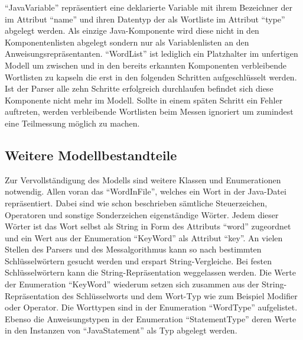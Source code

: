 \documentclass[gb,ngerman]{stthesis}
\begin{document}
				"`JavaVariable"' repräsentiert eine deklarierte Variable mit ihrem Bezeichner der im Attribut "`name"' und ihren Datentyp der als Wortliste im Attribut "`type"' abgelegt werden. Als einzige Java-Komponente wird diese nicht in den Komponentenlisten abgelegt sondern nur als Variablenlisten an den Anweisungsrepräsentanten. \newline \newline
				"`WordList"' ist lediglich ein Platzhalter im unfertigen Modell um zwischen und in den bereits erkannten Komponenten verbleibende Wortlisten zu kapseln die erst in den folgenden Schritten aufgeschlüsselt werden. Ist der Parser alle zehn Schritte erfolgreich durchlaufen befindet sich diese Komponente nicht mehr im Modell. Sollte in einem späten Schritt ein Fehler auftreten, werden verbleibende Wortlisten beim Messen ignoriert um zumindest eine Teilmessung möglich zu machen.
			\subsection{Weitere Modellbestandteile}
			Zur Vervollständigung des Modells sind weitere Klassen und Enumerationen notwendig. Allen voran das "`WordInFile"', welches ein Wort in der Java-Datei repräsentiert. Dabei sind wie schon beschrieben sämtliche Steuerzeichen, Operatoren und sonstige Sonderzeichen eigenständige Wörter. Jedem dieser Wörter ist das Wort selbst als String in Form des Attributs "`word"' zugeordnet und ein Wert aus der Enumeration "`KeyWord"' als Attribut "`key"'. An vielen Stellen des Parsers und des Messalgorithmus kann so nach bestimmten Schlüsselwörtern gesucht werden und erspart String-Vergleiche. Bei festen Schlüsselwörtern kann die String-Repräsentation weggelassen werden. Die Werte der Enumeration "`KeyWord"' wiederum setzen sich zusammen aus der String-Repräsentation des Schlüsselworts und dem Wort-Typ wie zum Beispiel Modifier oder Operator. Die Worttypen sind in der Enumeration "`WordType"' aufgelistet. Ebenso die Anweisungstypen in der Enumeration "`StatementType"' deren Werte in den Instanzen von "`JavaStatement"' als Typ abgelegt werden. \newpage
\end{document}

